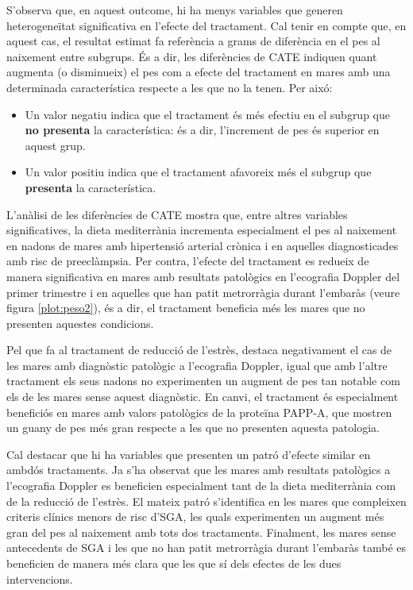 \documentclass[../main.tex]{subfiles}
\begin{document}
    S’observa que, en aquest outcome, hi ha menys variables que generen heterogeneïtat significativa en l’efecte del tractament. Cal tenir en compte que, en aquest cas, el resultat estimat fa referència a grams de diferència en el pes al naixement entre subgrups. És a dir, les diferències de CATE indiquen quant augmenta (o disminueix) el pes com a efecte del tractament en mares amb una determinada característica respecte a les que no la tenen. Per aixó:
    \begin{itemize}
        \item Un valor negatiu indica que el tractament és més efectiu en el subgrup que \textbf{no presenta} la característica: és a dir, l’increment de pes és superior en aquest grup. 
        \item Un valor positiu indica que el tractament afavoreix més el subgrup que \textbf{presenta} la característica. 
    \end{itemize}

    L’anàlisi de les diferències de CATE mostra que, entre altres variables significatives, la dieta mediterrània incrementa especialment el pes al naixement en nadons de mares amb hipertensió arterial crònica i en aquelles diagnosticades amb risc de preeclàmpsia. Per contra, l’efecte del tractament es redueix de manera significativa en mares amb resultats patològics en l’ecografia Doppler del primer trimestre i en aquelles que han patit metrorràgia durant l’embaràs (veure figura \ref{plot:peso2}), és a dir, el tractament beneficia més les mares que no presenten aquestes condicions.\par
    Pel que fa al tractament de reducció de l’estrès, destaca negativament el cas de les mares amb diagnòstic patològic a l’ecografia Doppler, igual que amb l'altre tractament els seus nadons no experimenten un augment de pes tan notable com els de les mares sense aquest diagnòstic. En canvi, el tractament és especialment beneficiós en mares amb valors patològics de la proteïna PAPP-A, que mostren un guany de pes més gran respecte a les que no presenten aquesta patologia.\par
    Cal destacar que hi ha variables que presenten un patró d’efecte similar en ambdós tractaments. Ja s’ha observat que les mares amb resultats patològics a l’ecografia Doppler es beneficien especialment tant de la dieta mediterrània com de la reducció de l’estrès. El mateix patró s’identifica en les mares que compleixen criteris clínics menors de risc d’SGA, les quals experimenten un augment més gran del pes al naixement amb tots dos tractaments. Finalment, les mares sense antecedents de SGA i les que no han patit metrorràgia durant l’embaràs també es beneficien de manera més clara que les que sí dels efectes de les dues intervencions.
\end{document}
